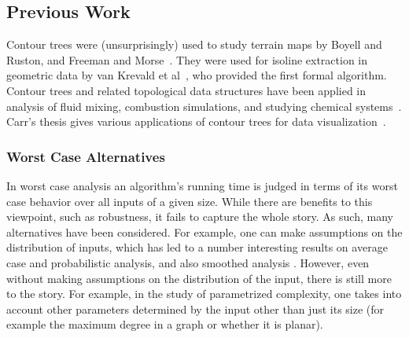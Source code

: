 \documentclass[11pt]{article}
\theoremstyle{definition}
\begin{document}
% 

\subsection{Previous Work}

Contour trees were (unsurprisingly) used to study terrain maps by Boyell and Ruston, and Freeman and Morse~\cite{BoRu63,FrMo67}.
They were used for isoline extraction in geometric data by van Krevald et al~\cite{kobps-ctsssit-97}, who provided
the first formal algorithm. 
Contour trees and related topological data structures have been applied in analysis of fluid mixing, combustion simulations,
and studying chemical systems~\cite{LaBe+06,BrWe+10,BeWe+11,BrWe+11,MaGr+11}. Carr's thesis gives various
applications of contour trees for data visualization~\cite{c-tmi-04}.



\subsubsection{Worst Case Alternatives}
In worst case analysis an algorithm's running time is judged in terms of its worst 
case behavior over all inputs of a given size.  While there are benefits to this viewpoint, 
such as robustness,  it fails to capture the whole story.  As such, many alternatives 
have been considered.  For example, one can make assumptions on the distribution of 
inputs, which has led to a number interesting results on average case and probabilistic 
analysis, and also smoothed analysis \cite{st-saa-04}.  However, even without making 
assumptions on the distribution of the input, there is still more to the story.
For example, in the study of parametrized complexity, one takes into account other 
parameters determined by the input other than just its size (for example the maximum 
degree in a graph or whether it is planar).
\end{document}
